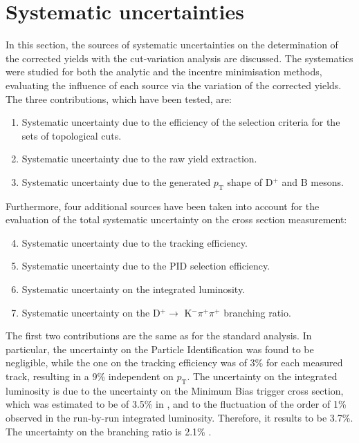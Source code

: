 \documentclass[b5paper,10pt,twoside,oldstyle,classica]{toptesi}
\newcommand{\pt}{p_\text{T}}
\begin{document}
\section{Systematic uncertainties}
In this section, the sources of systematic uncertainties on the determination of the corrected yields with the cut-variation analysis are discussed. The systematics were studied for both the analytic and the incentre minimisation methods, evaluating the influence of each source via the variation of the corrected yields. The three contributions, which have been tested, are: 
\begin{enumerate}
 \item Systematic uncertainty due to the efficiency of the selection criteria for the sets of topological cuts.
 \item Systematic uncertainty due to the raw yield extraction.
 \item Systematic uncertainty due to the generated $\pt$ shape of D$^+$ and B mesons.
\end{enumerate}
Furthermore, four additional sources have been taken into account for the evaluation of the total systematic uncertainty on the cross section measurement:
\begin{enumerate}
 \setcounter{enumi}{3}
 \item Systematic uncertainty due to the tracking efficiency.
 \item Systematic uncertainty due to the PID selection efficiency.
 \item Systematic uncertainty on the integrated luminosity.
 \item Systematic uncertainty on the D$^+\rightarrow$ K$^-\pi^+\pi^+$ branching ratio. 
\end{enumerate}
The first two contributions are the same as for the standard analysis. In particular, the uncertainty on the Particle Identification was found to be negligible, while the one on the tracking efficiency was of 3\% for each measured track, resulting in a 9\% independent on $\pt$. The uncertainty on the integrated luminosity is due to the uncertainty on the Minimum Bias trigger cross section, which was estimated to be of 3.5\% in \cite{Abelev:2014epa}, and to the fluctuation of the order of 1\% observed in the run-by-run integrated luminosity. Therefore, it results to be 3.7\%. The uncertainty on the branching ratio is 2.1\% \cite{Agashe:2014kda}.  
\end{document}
